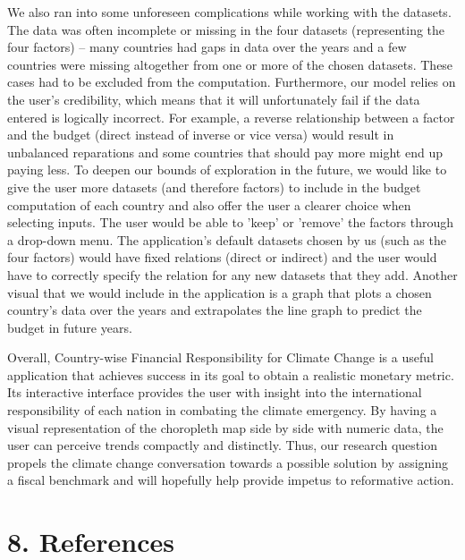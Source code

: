 \documentclass[fontsize=11pt]{article}
\begin{document}
    We also ran into some unforeseen complications while working with the datasets. The data was often incomplete or missing in the 
    four datasets (representing the four factors) – many countries had gaps in data over the years and a few countries were missing 
    altogether from one or more of the chosen datasets. These cases had to be excluded from the computation. Furthermore, our model 
    relies on the user’s credibility, which means that it will unfortunately fail if the data entered is logically incorrect. 
    For example, a reverse relationship between a factor and the budget (direct instead of inverse or vice versa) would result in 
    unbalanced reparations and some countries that should pay more might end up paying less. To deepen our bounds of exploration in the future, 
    we would like to give the user more datasets (and therefore factors) to include in the budget computation of each country 
    and also offer the user a clearer choice when selecting inputs. The user would be able to 'keep' or 'remove' the factors through a drop-down menu. 
    The application's default datasets chosen by us (such as the four factors) would have fixed relations (direct or indirect) 
    and the user would have to correctly specify the relation for any new datasets that they add. Another visual that we would include 
    in the application is a graph that plots a chosen country’s data over the years and extrapolates the line graph to predict the budget in future years.
    \newline
    
    Overall, Country-wise Financial Responsibility for Climate Change is a useful application that achieves success in its goal 
    to obtain a realistic monetary metric. Its interactive interface provides 
    the user with insight into the international responsibility of each nation in combating the climate emergency. By having a visual representation 
    of the choropleth map side by side with numeric data, the user can perceive trends compactly and distinctly. Thus, our research question 
    propels the climate change conversation towards a possible solution by assigning a fiscal benchmark and will hopefully 
    help provide impetus to reformative action.
    \newline

    \section*{8. References}
\end{document}
